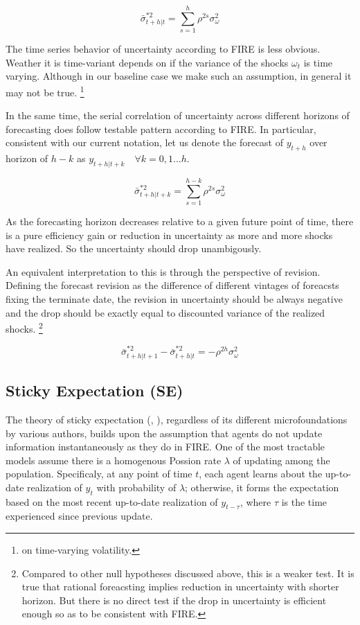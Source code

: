 \documentclass[]{article}
\begin{document}
$$\bar \sigma^{*2}_{t+h|t} = \sum^{h}_{s=1}\rho^{2s} \sigma^2_{\omega}$$

The time series behavior of uncertainty according to FIRE is less obvious. Weather it is time-variant depends on if the variance of the shocks $\omega_t$ is time varying. Although in our baseline case we make such an assumption, in general it may not be true. \footnote{\citet{xx} on time-varying volatility.}

In the same time, the serial correlation of uncertainty across different horizons of forecasting does follow testable pattern according to FIRE. In particular, consistent with our current notation, let us denote the forecast of $y_{t+h}$ over horizon of $h-k$ as $y_{t+h|t+k} \quad \forall k =0,1...h$. 

$$\bar \sigma^{*2}_{t+h|t+k} = \sum^{h-k}_{s=1}\rho^{2s} \sigma^2_{\omega}$$

As the forecasting horizon decreases relative to a given future point of time, there is a pure efficiency gain or reduction in uncertainty as more and more shocks have realized. So the uncertainty should drop unambigously. 

An equivalent interpretation to this is through the perspective of revision. Defining the forecast revision as the difference of different vintages of foreacsts fixing the terminate date, the revision in uncertainty should be always negative and the drop should be exactly equal to discounted variance of the realized shocks. \footnote{Compared to other null hypotheses discussed above, this is a weaker test. It is true that rational foreacsting implies reduction in uncertainty with shorter horizon. But there is no direct test if the drop in uncertainty is efficient enough so as to be consistent with FIRE. }

$$\bar \sigma^{*2}_{t+h|t+1} - \bar \sigma^{*2}_{t+h|t} = - \rho^{2h}\sigma^2_\omega$$


\subsection{Sticky Expectation (SE)}

The theory of sticky expectation (\citet{xx}, \citet{xx} ), regardless of its different microfoundations by various authors, builds upon the assumption that agents do not update information instantaneously as they do in FIRE. One of the most tractable models assume there is a homogenous Possion rate $\lambda$ of updating among the population. Specificaly, at any point of time $t$, each agent learns about the up-to-date realization of $y_t$ with probability of $\lambda$; otherwise, it forms the expectation based on the most recent up-to-date realization of $y_{t-\tau}$, where $\tau$ is the time experienced since previous update. 
\end{document}
